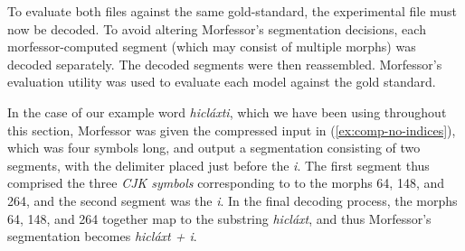  
 

To evaluate both files against the same gold-standard, the experimental file 
must now be decoded. To avoid altering  Morfessor’s segmentation decisions, 
each morfessor-computed segment (which may consist of multiple morphs) was decoded separately. The decoded segments were then reassembled. Morfessor's evaluation utility was used to evaluate each model against the gold standard. 

In the case of our example word \textit{hicl\'{a}xti}, which we have been using 
throughout this section, Morfessor was given the compressed input in 
(\ref{ex:comp-no-indices}), which was four symbols long, and output a 
segmentation consisting of two segments, with the delimiter placed just 
before the \textit{i}. The first segment thus comprised the three 
\emph{CJK symbols} corresponding to to the morphs 64, 148, and 264, 
and the second segment was the \emph{i}. In the final decoding process, 
the morphs 64, 148, and 264 together map to the substring \textit{hicl\'{a}xt}, 
and thus Morfessor's segmentation becomes \textit{hicl\'{a}xt + i}.

